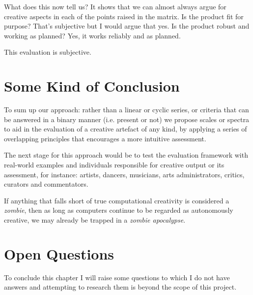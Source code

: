 \begin{draft}
  What does this now tell us? It shows that we can almost always argue for creative aspects in each of the points raised in the matrix. Is the product fit for purpose? That's subjective but I would argue that yes. Is the product robust and working as planned? Yes, it works reliably and as planned.

  This evaluation is subjective.
\end{draft}


\section{Some Kind of Conclusion}



To sum up our approach: rather than a linear or cyclic series, or criteria that can be answered in a binary manner (i.e. present or not) we propose scales or spectra to aid in the evaluation of a creative artefact of any kind, by applying a series of overlapping principles that encourages a more intuitive assessment.

The next stage for this approach would be to test the evaluation framework with real-world examples and individuals responsible for creative output or its assessment, for instance: artists, dancers, musicians, arts administrators, critics, curators and commentators.

If anything that falls short of true computational creativity is considered a \emph{zombie}, then as long as computers continue to be regarded as autonomously creative, we may already be trapped in a \emph{zombie apocalypse}.

\section{Open Questions}

To conclude this chapter I will raise some questions to which I do not have answers and attempting to research them is beyond the scope of this project.


